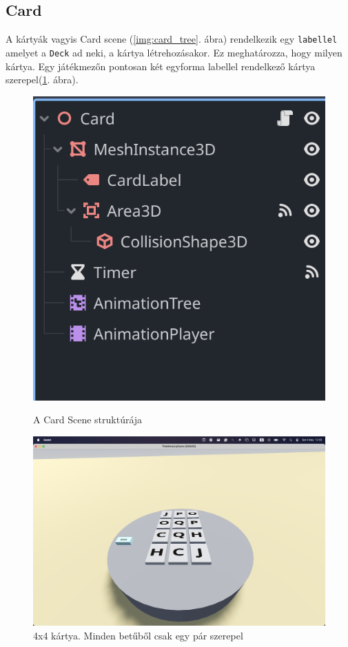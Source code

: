 \subsection{Card}
A kártyák vagyis Card scene (\ref{img:card_tree}. ábra) rendelkezik egy \lstinline|labellel| amelyet a \lstinline|Deck| ad neki, a kártya létrehozásakor. Ez meghatározza, hogy milyen kártya. 
Egy játékmezőn pontosan két egyforma labellel rendelkező kártya szerepel(\ref{img:cards_has_pairs}. ábra).

\begin{figure}[H]
    \centering
    \begin{minipage}[b]{0.45\textwidth}
        \includegraphics[width=\textwidth]{img/cards_scene_tree.png}
        \caption{A Card Scene struktúrája}
        \label{img:card_tree}
    \end{minipage}
    \hfill
    \begin{minipage}[b]{0.45\textwidth}
        \includegraphics[width=\textwidth]{img/4x4_all_card_fliped.png}
        \caption{4x4 kártya. Minden betűből csak egy pár szerepel}
        \label{img:cards_has_pairs}  
    \end{minipage}
\end{figure}

